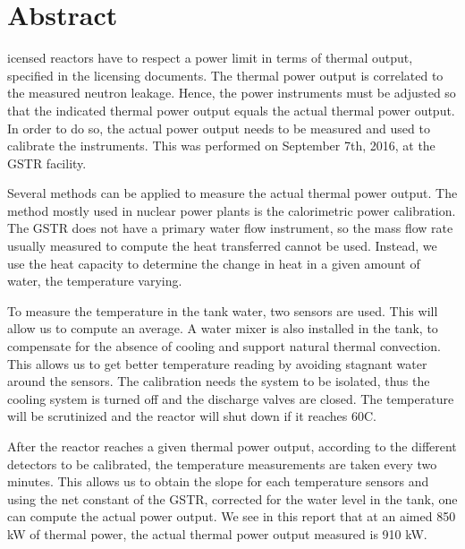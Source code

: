 %
%
%

\chapter*{Abstract}
\begin{SingleSpace}
icensed reactors have to respect a power limit in terms of thermal output, specified in the licensing documents. The thermal power output is correlated to the measured neutron leakage. Hence, the power instruments must be adjusted so that the indicated thermal power output equals the actual thermal power output. In order to do so, the actual power output needs to be measured and used to calibrate the instruments. This was performed on September 7th, 2016, at the GSTR facility.

Several methods can be applied to measure the actual thermal power output. The method mostly used in nuclear power plants is the calorimetric power calibration. The GSTR does not have a primary water flow instrument, so the mass flow rate usually measured to compute the heat transferred cannot be used. Instead, we use the heat capacity to determine the change in heat in a given amount of water, the temperature varying.

To measure the temperature in the tank water, two sensors are used. This will allow us to compute an average. A water mixer is also installed in the tank, to compensate for the absence of cooling and support natural thermal convection. This allows us to get better temperature reading by avoiding stagnant water around the sensors. The calibration needs the system to be isolated, thus the cooling system is turned off and the discharge valves are closed. The temperature will be scrutinized and the reactor will shut down if it reaches 60\degree C.

After the reactor reaches a given thermal power output, according to the different detectors to be calibrated, the temperature measurements are taken every two minutes. This allows us to obtain the slope for each temperature sensors and using the net constant of the GSTR, corrected for the water level in the tank, one can compute the actual power output. We see in this report that at an aimed 850 kW of thermal power, the actual thermal power output measured is 910 kW.


\end{SingleSpace}
